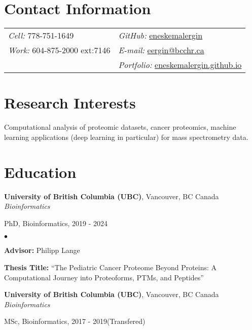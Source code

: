 \documentclass[margin,line]{res}
\newenvironment{list1}{
  \begin{list}{\ding{113}}{%
      \setlength{\itemsep}{0in}
      \setlength{\parsep}{0in} \setlength{\parskip}{0in}
      \setlength{\topsep}{0in} \setlength{\partopsep}{0in}
      \setlength{\leftmargin}{0.17in}}}{\end{list}}
\newenvironment{list2}{
  \begin{list}{$\bullet$}{%
      \setlength{\itemsep}{0in}
      \setlength{\parsep}{0in} \setlength{\parskip}{0in}
      \setlength{\topsep}{0in} \setlength{\partopsep}{0in}
      \setlength{\leftmargin}{0.2in}}}{\end{list}}
\begin{document}

\begin{resume}
\section{\sc Contact Information}
\vspace{.05in}
\begin{tabular}{@{}p{2in}p{4in}}
{\it Cell:} 778-751-1649               & \hfill {\it GitHub:}  \href{https://github.com/eneskemalergin}{eneskemalergin} \\
{\it Work:} 604-875-2000 ext:7146    & \hfill {\it E-mail:}  \href{mailto:eergin@bcchr.ca}{eergin@bcchr.ca}\\
                                    & \hfill {\it Portfolio:}  \href{eneskemalergin.github.io}{eneskemalergin.github.io} \\
\end{tabular}


\section{\sc Research Interests}
Computational analysis of proteomic datasets, cancer proteomics, machine learning applications (deep learning in particular) for mass spectrometry data.

\section{\sc Education}

{\bf University of British Columbia (UBC)}, Vancouver, BC Canada\\
{\em Bioinformatics}
\begin{list1}
\item[]  PhD, Bioinformatics, 2019 - 2024
\begin{list2}
\vspace*{.05in}
\item {\bf Advisor:}  Philipp Lange
\item {\bf Thesis Title:}  ``The Pediatric Cancer Proteome Beyond Proteins: A Computational Journey into Proteoforms, PTMs, and Peptides''
\end{list2}
\end{list1}

{\bf University of British Columbia (UBC)}, Vancouver, BC Canada\\
{\em Bioinformatics}
\begin{list1}
\item[]  MSc, Bioinformatics, 2017 - 2019(Transfered)
\end{list1}


\end{resume}
\end{document}
